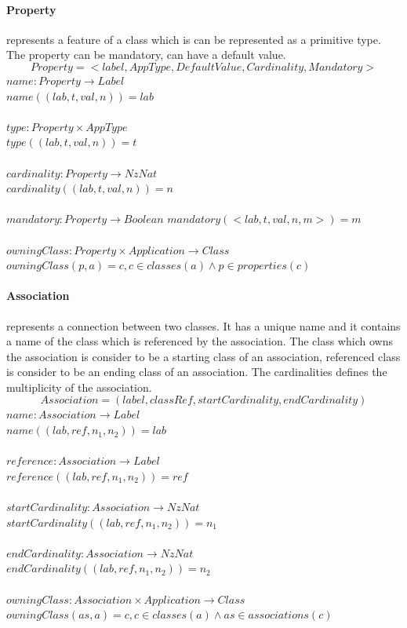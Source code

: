 \documentclass[11pt]{article}
\begin{document}
\paragraph{Property} represents a feature of  a class which is can be represented as a primitive type. The property can be mandatory, can have a default value.
$$
Property = < label, AppType, DefaultValue, Cardinality, Mandatory >
$$
$name : Property \rightarrow Label$ \\
$name((lab, t, val, n)) = lab$ \\ \\
$type : Property \times AppType$ \\
$type((lab, t, val, n)) = t$ \\ \\
$cardinality : Property \rightarrow NzNat$ \\
$cardinality((lab, t, val, n)) = n$ \\ \\
$mandatory : Property \rightarrow Boolean $
$mandatory(<lab, t, val, n, m>) = m $ \\ \\
$owningClass : Property \times Application \rightarrow Class $ \\
$owningClass(p, a) = c, c \in classes(a) \wedge p \in properties(c) $

\paragraph {Association} represents a connection between two classes. It has a unique name and it contains a name of the class which is referenced by the association. The class which owns the association is consider to be a starting class of an association, referenced class is consider to be an ending class of an association. The cardinalities defines the multiplicity of the association.
$$
Association = (label, classRef, startCardinality, endCardinality)
$$
$name : Association \rightarrow Label$ \\
$name((lab, ref, n_1, n_2)) = lab$\\ \\
$reference : Association \rightarrow Label$ \\
$reference((lab, ref, n_1, n_2)) = ref$\\ \\
$startCardinality : Association \rightarrow NzNat$ \\
$startCardinality((lab, ref, n_1, n_2)) = n_1$\\ \\
$endCardinality : Association \rightarrow NzNat$ \\
$endCardinality((lab, ref, n_1, n_2)) = n_2$ \\ \\
$owningClass : Association \times Application \rightarrow Class $ \\
$owningClass(as, a) = c, c \in classes(a) \wedge as \in associations(c) $
\end{document}
